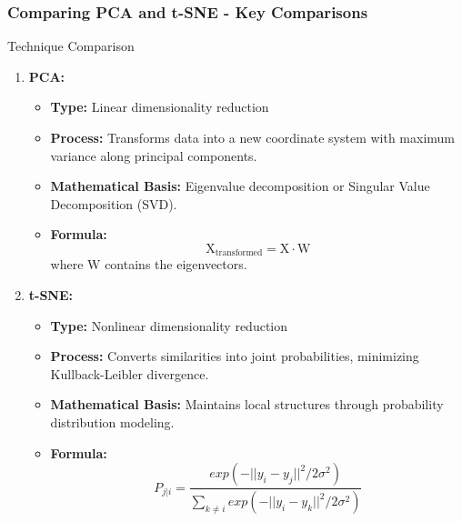 \documentclass[aspectratio=169]{beamer}
\begin{document}
\begin{frame}[fragile]
    \frametitle{Comparing PCA and t-SNE - Key Comparisons}
    \begin{block}{Technique Comparison}
        \begin{enumerate}
            \item \textbf{PCA:}
            \begin{itemize}
                \item \textbf{Type:} Linear dimensionality reduction
                \item \textbf{Process:} Transforms data into a new coordinate system with maximum variance along principal components.
                \item \textbf{Mathematical Basis:} Eigenvalue decomposition or Singular Value Decomposition (SVD).
                \item \textbf{Formula:} 
                \begin{equation}
                    \text{X}_{\mathrm{transformed}} = \text{X} \cdot \text{W}
                \end{equation}
                where \( \text{W} \) contains the eigenvectors.
            \end{itemize}
            \item \textbf{t-SNE:}
            \begin{itemize}
                \item \textbf{Type:} Nonlinear dimensionality reduction
                \item \textbf{Process:} Converts similarities into joint probabilities, minimizing Kullback-Leibler divergence.
                \item \textbf{Mathematical Basis:} Maintains local structures through probability distribution modeling.
                \item \textbf{Formula:} 
                \begin{equation}
                    P_{j|i} = \frac{exp(-||y_i - y_j||^2/2\sigma^2)}{\sum_{k \neq i} exp(-||y_i - y_k||^2/2\sigma^2)}
                \end{equation}
            \end{itemize}
        \end{enumerate}
    \end{block}
\end{frame}
\end{document}
